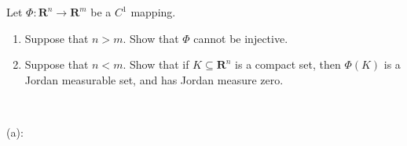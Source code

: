\documentclass{article}
\newcommand{\R}{\mathbf{R}}
\theoremstyle{plain} %
\numberwithin{thm}{section} %
\theoremstyle{definition}
\begin{document}
    \newpage
    \begin{question}{34}
        Let $\Phi:\R^n\rightarrow\R^m$ be a $C^1$ mapping.
        \begin{enumerate}[label=(\alph*)]
            \item Suppose that $n>m$. Show that $\Phi$ cannot be injective.
            
            \item Suppose that $n<m$. Show that if $K\subseteq\R^n$ is a compact set, then $\Phi(K)$ is a Jordan measurable set, and has Jordan measure zero.
        \end{enumerate}
        \tcblower
        \ 
        
        (a):

        
    \end{question}
\end{document}
